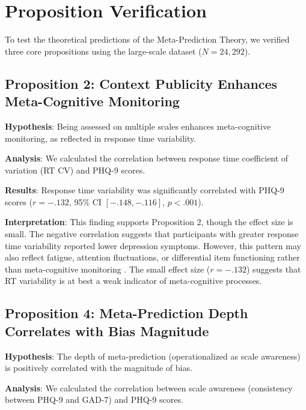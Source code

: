 \documentclass[10pt,twocolumn]{article}
\begin{document}

\section{Proposition Verification}

To test the theoretical predictions of the Meta-Prediction Theory, we verified three core propositions using the large-scale dataset ($N = 24{,}292$).

\subsection{Proposition 2: Context Publicity Enhances Meta-Cognitive Monitoring}

\textbf{Hypothesis}: Being assessed on multiple scales enhances meta-cognitive monitoring, as reflected in response time variability.

\textbf{Analysis}: We calculated the correlation between response time coefficient of variation (RT CV) and PHQ-9 scores.

\textbf{Results}: Response time variability was significantly correlated with PHQ-9 scores ($r = -.132$, 95\% CI $[-.148, -.116]$, $p < .001$).

\textbf{Interpretation}: This finding supports Proposition 2, though the effect size is small. The negative correlation suggests that participants with greater response time variability reported lower depression symptoms. However, this pattern may also reflect fatigue, attention fluctuations, or differential item functioning rather than meta-cognitive monitoring \citep{Wise2006}. The small effect size ($r = -.132$) suggests that RT variability is at best a weak indicator of meta-cognitive processes.

\subsection{Proposition 4: Meta-Prediction Depth Correlates with Bias Magnitude}

\textbf{Hypothesis}: The depth of meta-prediction (operationalized as scale awareness) is positively correlated with the magnitude of bias.

\textbf{Analysis}: We calculated the correlation between scale awareness (consistency between PHQ-9 and GAD-7) and PHQ-9 scores.
\end{document}
